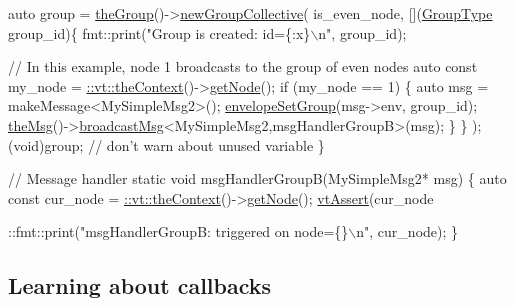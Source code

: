 \begin{DoxyCodeInclude}
  \textcolor{keyword}{auto} group = \hyperlink{namespacevt_a4548473dce44fb654400009e2b2fe64e}{theGroup}()->\hyperlink{structvt_1_1group_1_1_group_manager_a92b301d6cf77af7d57ed822c6f044d58}{newGroupCollective}(
    is\_even\_node, [](\hyperlink{namespacevt_a27b5e4411c9b6140c49100e050e2f743}{GroupType} group\_id)\{
      fmt::print(\textcolor{stringliteral}{"Group is created: id=\{:x\}\(\backslash\)n"}, group\_id);

      \textcolor{comment}{// In this example, node 1 broadcasts to the group of even nodes}
      \textcolor{keyword}{auto} \textcolor{keyword}{const} my\_node = \hyperlink{namespacevt_a26551fe0e6e6a1371111df5b12c7e92c}{::vt::theContext}()->\hyperlink{structvt_1_1ctx_1_1_context_a0d52c263ce8516546a67443d9a86fa5f}{getNode}();
      \textcolor{keywordflow}{if} (my\_node == 1) \{
        \textcolor{keyword}{auto} msg = makeMessage<MySimpleMsg2>();
        \hyperlink{namespacevt_a9f9d4ce6034c0eaaf98bdffd33d0e1c7}{envelopeSetGroup}(msg->env, group\_id);
        \hyperlink{namespacevt_aeafd31f866aeb4dc6fc2f6ee97136350}{theMsg}()->\hyperlink{group__typesafehan_ga344802a09eb0e88006900976d1dfa204}{broadcastMsg}<MySimpleMsg2,msgHandlerGroupB>(msg);
      \}
    \}
  );
  (void)group;  \textcolor{comment}{// don't warn about unused variable}
\}

\textcolor{comment}{// Message handler}
\textcolor{keyword}{static} \textcolor{keywordtype}{void} msgHandlerGroupB(MySimpleMsg2* msg) \{
  \textcolor{keyword}{auto} \textcolor{keyword}{const} cur\_node = \hyperlink{namespacevt_a26551fe0e6e6a1371111df5b12c7e92c}{::vt::theContext}()->\hyperlink{structvt_1_1ctx_1_1_context_a0d52c263ce8516546a67443d9a86fa5f}{getNode}();
  \hyperlink{config__assert_8h_aeddd4990a496e91a0ca5d6c16437359b}{vtAssert}(cur\_node %

  ::fmt::print(\textcolor{stringliteral}{"msgHandlerGroupB: triggered on node=\{\}\(\backslash\)n"}, cur\_node);
\}
\end{DoxyCodeInclude}
\hypertarget{tutorial-1g}{}\subsection{Learning about callbacks}\label{tutorial-1g}

